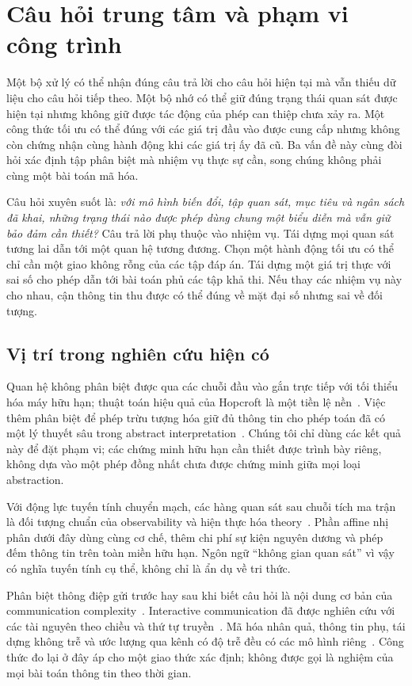 \section{Câu hỏi trung tâm và phạm vi công trình}
Một bộ xử lý có thể nhận đúng câu trả lời cho câu hỏi hiện tại mà vẫn thiếu dữ liệu cho câu hỏi tiếp theo. Một bộ nhớ có thể giữ đúng trạng thái quan sát được hiện tại nhưng không giữ được tác động của phép can thiệp chưa xảy ra. Một công thức tối ưu có thể đúng với các giá trị đầu vào được cung cấp nhưng không còn chứng nhận cùng hành động khi các giá trị ấy đã cũ. Ba vấn đề này cùng đòi hỏi xác định tập phân biệt mà nhiệm vụ thực sự cần, song chúng không phải cùng một bài toán mã hóa.

Câu hỏi xuyên suốt là: \emph{với mô hình biến đổi, tập quan sát, mục tiêu và ngân sách đã khai, những trạng thái nào được phép dùng chung một biểu diễn mà vẫn giữ bảo đảm cần thiết?} Câu trả lời phụ thuộc vào nhiệm vụ. Tái dựng mọi quan sát tương lai dẫn tới một quan hệ tương đương. Chọn một hành động tối ưu có thể chỉ cần một giao không rỗng của các tập đáp án. Tái dựng một giá trị thực với sai số cho phép dẫn tới bài toán phủ các tập khả thi. Nếu thay các nhiệm vụ này cho nhau, cận thông tin thu được có thể đúng về mặt đại số nhưng sai về đối tượng.

\subsection{Vị trí trong nghiên cứu hiện có}
Quan hệ không phân biệt được qua các chuỗi đầu vào gắn trực tiếp với tối thiểu hóa máy hữu hạn; thuật toán hiệu quả của Hopcroft là một tiền lệ nền~\cite{hopcroft}. Việc thêm phân biệt để phép trừu tượng hóa giữ đủ thông tin cho phép toán đã có một lý thuyết sâu trong abstract interpretation~\cite{giacobazzi}. Chúng tôi chỉ dùng các kết quả này để đặt phạm vi; các chứng minh hữu hạn cần thiết được trình bày riêng, không dựa vào một phép đồng nhất chưa được chứng minh giữa mọi loại abstraction.

Với động lực tuyến tính chuyển mạch, các hàng quan sát sau chuỗi tích ma trận là đối tượng chuẩn của observability và hiện thực hóa theory~\cite{petreczky}. Phần affine nhị phân dưới đây dùng cùng cơ chế, thêm chi phí sự kiện nguyên dương và phép đếm thông tin trên toàn miền hữu hạn. Ngôn ngữ ``không gian quan sát'' vì vậy có nghĩa tuyến tính cụ thể, không chỉ là ẩn dụ về tri thức.

Phân biệt thông điệp gửi trước hay sau khi biết câu hỏi là nội dung cơ bản của communication complexity~\cite{roughgarden}. Interactive communication đã được nghiên cứu với các tài nguyên theo chiều và thứ tự truyền~\cite{ahlswede1997}. Mã hóa nhân quả, thông tin phụ, tái dựng không trễ và ước lượng qua kênh có độ trễ đều có các mô hình riêng~\cite{kaspi2013,mayekar2021,sun2019}. Công thức đo lại ở đây áp cho một giao thức xác định; không được gọi là nghiệm của mọi bài toán thông tin theo thời gian.

